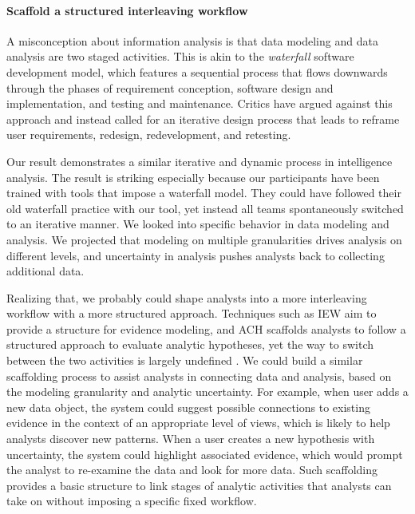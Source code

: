 \paragraph{Scaffold a structured interleaving workflow}

A misconception about information analysis is that data modeling and
data analysis are two staged activities. This is akin to the \emph{waterfall}
software development model, which features a sequential process that
flows downwards through the phases of requirement conception, software
design and implementation, and testing and maintenance. Critics have
argued against this approach and instead called for an iterative design
process that leads to reframe user requirements,
redesign, redevelopment, and retesting.

Our result demonstrates a similar iterative and dynamic process in intelligence
analysis. The result is striking especially because our participants have been
trained with tools that impose a waterfall model. They could have followed their
old waterfall practice with our tool, yet instead all teams spontaneously
switched to an iterative manner. We looked into specific behavior in data modeling and analysis. We projected that modeling on multiple granularities drives analysis on different levels, and uncertainty in analysis pushes analysts back to collecting additional data.

Realizing that, we probably could shape analysts into a more interleaving
workflow with a more structured approach. Techniques such as IEW aim to provide
a structure for evidence modeling, and ACH scaffolds analysts to follow a
structured approach to evaluate analytic hypotheses, yet the way to switch
between the two activities is largely undefined \cite{Kang2011}. We could build
a similar scaffolding process to assist analysts in connecting data and
analysis, based on the modeling granularity and analytic uncertainty. For
example, when user adds a new data object, the system could suggest possible
connections to existing evidence in the context of an appropriate level of
views, which is likely to help analysts discover new patterns. When a user
creates a new hypothesis with uncertainty, the system could highlight associated
evidence, which would prompt the analyst to re-examine the data and look for
more data. Such scaffolding provides a basic structure to link stages of
analytic activities that analysts can take on without imposing a specific fixed
workflow.

